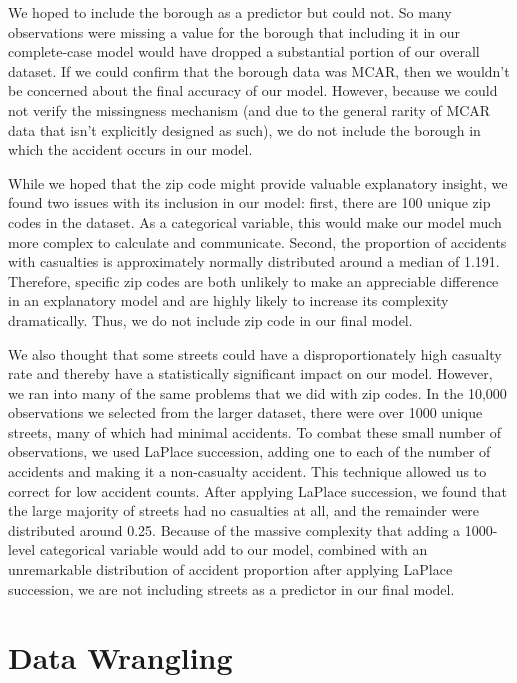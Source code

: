 \documentclass[
  letterpaper,
  DIV=11,
  numbers=noendperiod]{scrartcl}
\begin{document}
We hoped to include the borough as a predictor but could not. So many
observations were missing a value for the borough that including it in
our complete-case model would have dropped a substantial portion of our
overall dataset. If we could confirm that the borough data was MCAR,
then we wouldn't be concerned about the final accuracy of our model.
However, because we could not verify the missingness mechanism (and due
to the general rarity of MCAR data that isn't explicitly designed as
such), we do not include the borough in which the accident occurs in our
model.

While we hoped that the zip code might provide valuable explanatory
insight, we found two issues with its inclusion in our model: first,
there are 100 unique zip codes in the dataset. As a categorical
variable, this would make our model much more complex to calculate and
communicate. Second, the proportion of accidents with casualties is
approximately normally distributed around a median of 1.191. Therefore,
specific zip codes are both unlikely to make an appreciable difference
in an explanatory model and are highly likely to increase its complexity
dramatically. Thus, we do not include zip code in our final model.

We also thought that some streets could have a disproportionately high
casualty rate and thereby have a statistically significant impact on our
model. However, we ran into many of the same problems that we did with
zip codes. In the 10,000 observations we selected from the larger
dataset, there were over 1000 unique streets, many of which had minimal
accidents. To combat these small number of observations, we used LaPlace
succession, adding one to each of the number of accidents and making it
a non-casualty accident. This technique allowed us to correct for low
accident counts. After applying LaPlace succession, we found that the
large majority of streets had no casualties at all, and the remainder
were distributed around 0.25. Because of the massive complexity that
adding a 1000-level categorical variable would add to our model,
combined with an unremarkable distribution of accident proportion after
applying LaPlace succession, we are not including streets as a predictor
in our final model.

\hypertarget{data-wrangling}{%
\section{Data Wrangling}\label{data-wrangling}}
\end{document}
